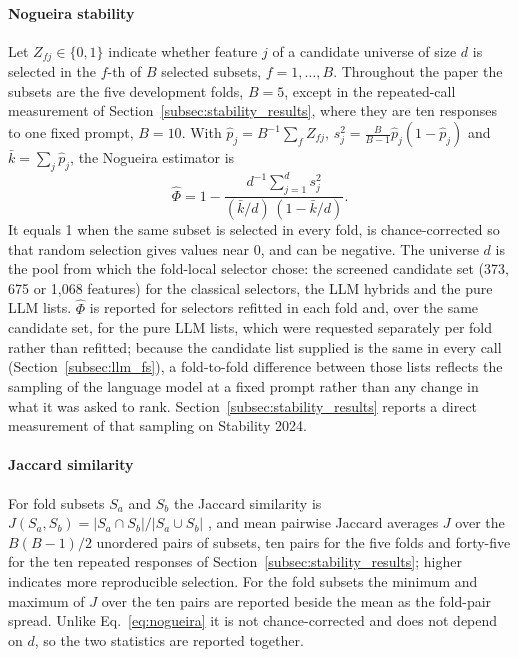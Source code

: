 \documentclass[final,5p,twocolumn]{elsarticle}
\begin{document}
\paragraph{Nogueira stability}
Let $Z_{fj}\in\{0,1\}$ indicate whether feature $j$ of a candidate universe of size $d$ is selected in the $f$-th of $B$ selected subsets, $f=1,\dots,B$. Throughout the paper the subsets are the five development folds, $B=5$, except in the repeated-call measurement of Section~\ref{subsec:stability_results}, where they are ten responses to one fixed prompt, $B=10$. With $\hat p_j=B^{-1}\sum_f Z_{fj}$, $s_j^2=\frac{B}{B-1}\hat p_j(1-\hat p_j)$ and $\bar k=\sum_j \hat p_j$, the Nogueira estimator is \cite{nogueira2018}
\begin{equation}
    \hat\Phi=1-\frac{d^{-1}\sum_{j=1}^{d}s_j^2}{(\bar k/d)\,(1-\bar k/d)} .
    \label{eq:nogueira}
\end{equation}
It equals 1 when the same subset is selected in every fold, is chance-corrected so that random selection gives values near 0, and can be negative. The universe $d$ is the pool from which the fold-local selector chose: the screened candidate set (373, 675 or 1,068 features) for the classical selectors, the LLM hybrids and the pure LLM lists. $\hat\Phi$ is reported for selectors refitted in each fold and, over the same candidate set, for the pure LLM lists, which were requested separately per fold rather than refitted; because the candidate list supplied is the same in every call (Section~\ref{subsec:llm_fs}), a fold-to-fold difference between those lists reflects the sampling of the language model at a fixed prompt rather than any change in what it was asked to rank. Section~\ref{subsec:stability_results} reports a direct measurement of that sampling on Stability 2024.

\paragraph{Jaccard similarity}
For fold subsets $S_a$ and $S_b$ the Jaccard similarity is $J(S_a,S_b)=|S_a\cap S_b|/|S_a\cup S_b|$ \cite{jaccard1901}, and mean pairwise Jaccard averages $J$ over the $B(B-1)/2$ unordered pairs of subsets, ten pairs for the five folds and forty-five for the ten repeated responses of Section~\ref{subsec:stability_results}; higher indicates more reproducible selection. For the fold subsets the minimum and maximum of $J$ over the ten pairs are reported beside the mean as the fold-pair spread. Unlike Eq.~\eqref{eq:nogueira} it is not chance-corrected and does not depend on $d$, so the two statistics are reported together.
\end{document}
